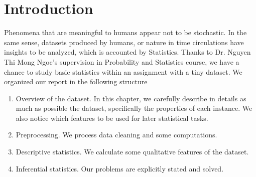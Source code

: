 \chapter{Introduction}

Phenomena that are meaningful to humans appear not to be stochastic. In the same sense, datasets produced by humans, or nature in time circulations have insights to be analyzed, which is accounted by Statistics. Thanks to Dr. Nguyen Thi Mong Ngoc's supervision in Probability and Statistics course, we have a chance to study basic statistics within an assignment with a tiny dataset. We organized our report in the following structure

\begin{enumerate}
  \item Overview of the dataset. In this chapter, we carefully describe in details as much as possible the dataset, specifically the properties of each instance. We also notice which features to be used for later statistical tasks.
  \item Preprocessing. We process data cleaning and some computations.
  \item Descriptive statistics. We calculate some qualitative features of the dataset.
  \item Inferential statistics. Our problems are explicitly stated and solved.
\end{enumerate}
